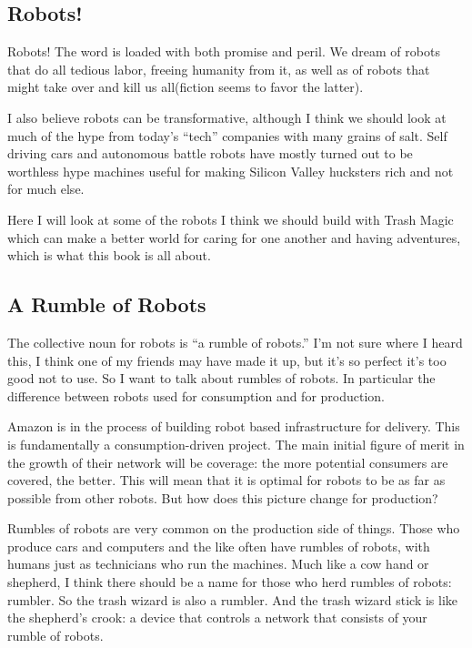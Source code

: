 \documentclass[11pt]{article}
\begin{document}
\subsection{Robots!}\label{robots}

Robots! The word is loaded with both promise and peril. We dream of
robots that do all tedious labor, freeing humanity from it, as well as
of robots that might take over and kill us all(fiction seems to favor
the latter).

I also believe robots can be transformative, although I think we should
look at much of the hype from today's ``tech'' companies with many
grains of salt. Self driving cars and autonomous battle robots have
mostly turned out to be worthless hype machines useful for making
Silicon Valley hucksters rich and not for much else.

Here I will look at some of the robots I think we should build with
Trash Magic which can make a better world for caring for one another and
having adventures, which is what this book is all about.

\subsection{A Rumble of Robots}\label{a-rumble-of-robots}

The collective noun for robots is ``a rumble of robots.'' I'm not sure
where I heard this, I think one of my friends may have made it up, but
it's so perfect it's too good not to use. So I want to talk about
rumbles of robots. In particular the difference between robots used for
consumption and for production.

Amazon is in the process of building robot based infrastructure for
delivery. This is fundamentally a consumption-driven project. The main
initial figure of merit in the growth of their network will be coverage:
the more potential consumers are covered, the better. This will mean
that it is optimal for robots to be as far as possible from other
robots. But how does this picture change for production?

Rumbles of robots are very common on the production side of things.
Those who produce cars and computers and the like often have rumbles of
robots, with humans just as technicians who run the machines. Much like
a cow hand or shepherd, I think there should be a name for those who
herd rumbles of robots: rumbler. So the trash wizard is also a rumbler.
And the trash wizard stick is like the shepherd's crook: a device that
controls a network that consists of your rumble of robots.
\end{document}
